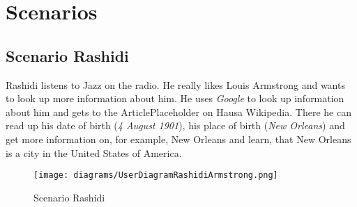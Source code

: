 \chapter{Scenarios}

\section{Scenario Rashidi}
Rashidi listens to Jazz on the radio. He really likes Louis Armstrong and wants to look up more information about him. He uses \textit{Google} to look up information about him and gets to the ArticlePlaceholder on Hausa Wikipedia. There he can read up his date of birth (\textit{4 August 1901}), his place of birth (\textit{New Orleans}) \citep{wd:03} and get more information on, for example, New Orleans and learn, that New Orleans is a city in the United States of America. 
\begin{figure}[H]
	\centering
	\texttt{[image: diagrams/UserDiagramRashidiArmstrong.png]}
	\caption{Scenario Rashidi}
	\label{fig:ScenarioRashidi}
\end{figure}

